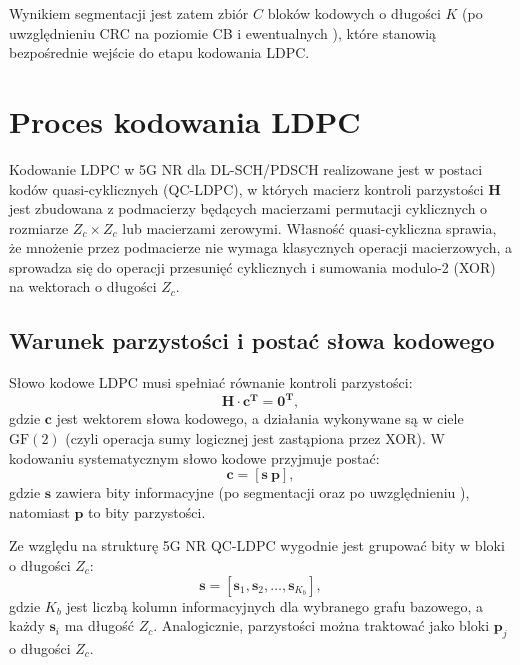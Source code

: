 Wynikiem segmentacji jest zatem zbiór $C$ bloków kodowych o długości $K$ (po uwzględnieniu CRC na poziomie CB i ewentualnych ), które stanowią bezpośrednie wejście do etapu kodowania LDPC.




\section{Proces kodowania LDPC}
\label{sec:analiza_proces_kodowania_ldpc}

Kodowanie LDPC w 5G NR dla DL-SCH/PDSCH realizowane jest w postaci kodów quasi-cyklicznych (QC-LDPC),
w których macierz kontroli parzystości \textbf{H} jest zbudowana z podmacierzy będących macierzami permutacji cyklicznych o rozmiarze $Z_c \times Z_c$ lub macierzami zerowymi. Własność quasi-cykliczna sprawia,
że mnożenie przez podmacierze nie wymaga klasycznych operacji macierzowych, a sprowadza się do operacji przesunięć cyklicznych
i sumowania modulo-2 (XOR) na wektorach o długości $Z_c$.

\subsection{Warunek parzystości i postać słowa kodowego}
Słowo kodowe LDPC musi spełniać równanie kontroli parzystości:
\begin{equation}
\mathbf{H} \cdot \mathbf{c}^\mathbf{T} = \mathbf{0}^\mathbf{T},
\label{eq:ldpc_parity_check}
\end{equation}
gdzie $\mathbf{c}$ jest wektorem słowa kodowego, a działania wykonywane są w ciele $\mathrm{GF}(2)$ (czyli operacja sumy logicznej jest zastąpiona przez XOR).
W kodowaniu systematycznym słowo kodowe przyjmuje postać:
\begin{equation}
\mathbf{c} = \left[\mathbf{s} \ \mathbf{p}\right],
\label{eq:codeword_systematic}
\end{equation}
gdzie $\mathbf{s}$ zawiera bity informacyjne (po segmentacji oraz po uwzględnieniu ), natomiast $\mathbf{p}$ to bity parzystości.

Ze względu na strukturę 5G NR QC-LDPC wygodnie jest grupować bity w bloki o długości $Z_c$:
\begin{equation}
\mathbf{s} = \left[\mathbf{s}_1,\mathbf{s}_2,\ldots,\mathbf{s}_{K_b}\right],
\label{eq:s_blocks}
\end{equation}
gdzie $K_b$ jest liczbą kolumn informacyjnych dla wybranego grafu bazowego, a każdy
$\mathbf{s}_i$ ma długość $Z_c$. Analogicznie, parzystości można traktować jako bloki $\mathbf{p}_j$ o długości $Z_c$.

